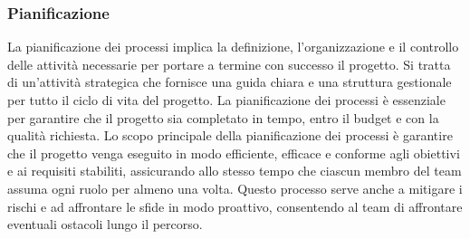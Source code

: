 \subsubsection{Pianificazione}
La pianificazione dei processi implica la definizione, l'organizzazione e il controllo delle attività necessarie per portare a termine con successo il progetto. Si tratta di un'attività strategica che fornisce una guida chiara e una struttura gestionale per tutto il ciclo di vita del progetto. La pianificazione dei processi è essenziale per garantire che il progetto sia completato in tempo, entro il budget e con la qualità richiesta.
Lo scopo principale della pianificazione dei processi è garantire che il progetto venga eseguito in modo efficiente, efficace e conforme agli obiettivi e ai requisiti stabiliti, assicurando allo stesso tempo che ciascun membro del team assuma ogni ruolo per almeno una volta. Questo processo serve anche a mitigare i rischi e ad affrontare le sfide in modo proattivo, consentendo al team di affrontare eventuali ostacoli lungo il percorso.

